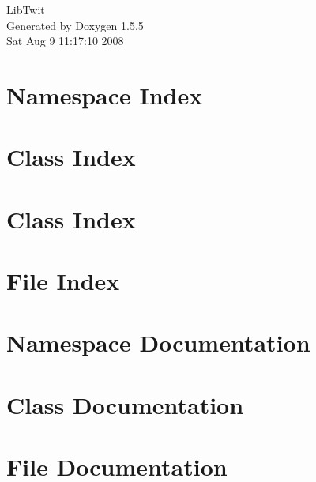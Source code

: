 \documentclass[a4paper]{book}
\begin{document}
\begin{titlepage}
\vspace*{7cm}
\begin{center}
{\Large LibTwit }\\
\vspace*{1cm}
{\large Generated by Doxygen 1.5.5}\\
\vspace*{0.5cm}
{\small Sat Aug 9 11:17:10 2008}\\
\end{center}
\end{titlepage}
\clearemptydoublepage
{}
\tableofcontents
\clearemptydoublepage
{}
\chapter{Namespace Index}

\chapter{Class Index}

\chapter{Class Index}

\chapter{File Index}

\chapter{Namespace Documentation}


\chapter{Class Documentation}












\chapter{File Documentation}












\printindex
\end{document}
